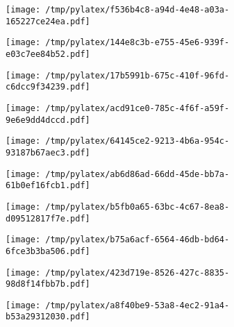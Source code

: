 \documentclass{article}
\begin{document}
\begin{figure}[htbp]
\begin{subfigure}[b]{.3\linewidth}
\texttt{[image: /tmp/pylatex/f536b4c8-a94d-4e48-a03a-165227ce24ea.pdf]}
\end{subfigure}
\begin{subfigure}[b]{.3\linewidth}
\texttt{[image: /tmp/pylatex/144e8c3b-e755-45e6-939f-e03c7ee84b52.pdf]}
\end{subfigure}
\begin{subfigure}[b]{.3\linewidth}
\texttt{[image: /tmp/pylatex/17b5991b-675c-410f-96fd-c6dcc9f34239.pdf]}
\end{subfigure}
\begin{subfigure}[b]{.3\linewidth}
\texttt{[image: /tmp/pylatex/acd91ce0-785c-4f6f-a59f-9e6e9dd4dccd.pdf]}
\end{subfigure}
\begin{subfigure}[b]{.3\linewidth}
\texttt{[image: /tmp/pylatex/64145ce2-9213-4b6a-954c-93187b67aec3.pdf]}
\end{subfigure}
\begin{subfigure}[b]{.3\linewidth}
\texttt{[image: /tmp/pylatex/ab6d86ad-66dd-45de-bb7a-61b0ef16fcb1.pdf]}
\end{subfigure}
\begin{subfigure}[b]{.3\linewidth}
\texttt{[image: /tmp/pylatex/b5fb0a65-63bc-4c67-8ea8-d09512817f7e.pdf]}
\end{subfigure}
\begin{subfigure}[b]{.3\linewidth}
\texttt{[image: /tmp/pylatex/b75a6acf-6564-46db-bd64-6fce3b3ba506.pdf]}
\end{subfigure}
\begin{subfigure}[b]{.3\linewidth}
\texttt{[image: /tmp/pylatex/423d719e-8526-427c-8835-98d8f14fbb7b.pdf]}
\end{subfigure}
\begin{subfigure}[b]{.3\linewidth}
\texttt{[image: /tmp/pylatex/a8f40be9-53a8-4ec2-91a4-b53a29312030.pdf]}
\end{subfigure}
\end{figure}
\end{document}
